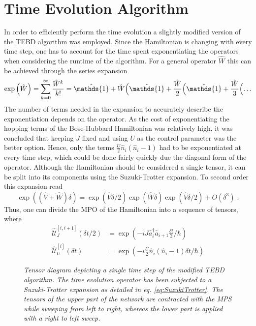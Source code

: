 \chapter{Time Evolution Algorithm}

In order to efficiently perform the time evolution a slightly modified version of the TEBD algorithm was employed. Since the Hamiltonian is changing with every time step, one has to account for the time spent exponentiating the operators when considering the runtime of the algorithm. For a general operator $\hat{W}$ this can be achieved through the series expansion
\begin{equation}
	\exp \left( \hat{W} \right) = \sum_{k = 0}^{\infty} \frac{\hat{W}^k}{k!} = \hat{\mathds{1}} + \hat{W} \Bigl(  \hat{\mathds{1}} + \frac{\hat{W}}{2} \Bigl( \hat{\mathds{1}} + \frac{\hat{W}}{3} \Bigl( \ldots
\end{equation}
The number of terms needed in the expansion to accurately describe the exponentiation depends on the operator. As the cost of exponentiating the hopping terms of the Bose-Hubbard Hamiltonian was relatively high, it was concluded that keeping $J$ fixed and using $U$ as the control parameter was the better option. Hence, only the terms $\frac{U}{2} \hat{n}_i (\hat{n}_i -1)$ had to be exponentiated at every time step, which could be done fairly quickly due the diagonal form of the operator.
Although the Hamiltonian should be considered a single tensor, it can be split into its components using the Suzuki-Trotter expansion. To second order this expansion read
\begin{equation}
	\exp\left(  ( \hat{V} + \hat{W}  ) \delta \right) = \exp\left(  \hat{V} \delta /2  \right) \exp\left(  \hat{W} \delta   \right) \exp\left(  \hat{V} \delta /2  \right) + O(\delta^3) \; . \label{eq:SuzukiTrotter}
\end{equation}
Thus, one can divide the MPO of the Hamiltonian into a sequence of tensors, where
\begin{align}
	\hat{\mathcal{U}}_{J}^{[i,i+1]} (\delta t/2) &= \exp \left( -i J \hat{a}_{i}^{\dag} \hat{a}_{i+1} \frac{\delta t}{2} / \hbar \right) \\
	\hat{\mathcal{U}}_{U}^{[i]} (\delta t) &= \exp \left( -i \frac{U}{2} \hat{n}_i (\hat{n}_i -1) \delta t / \hbar \right) 
\end{align}


\begin{figure}[h!]
	\centering
	
	\caption{\textit{Tensor diagram depicting a single time step of the modified TEBD algorithm. The time evolution operator has been subjected to a Suzuki-Trotter expansion as detailed in eq. \eqref{eq:SuzukiTrotter}. The tensors of the upper part of the network are contracted with the MPS while sweeping from left to right, whereas the lower part is applied with a right to left sweep.}}
	\label{fig:ModifiedTEBD}
\end{figure}

